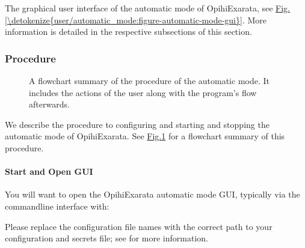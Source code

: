 \documentclass[letterpaper,11pt,english]{sphinxmanual}
\begin{document}
\sphinxAtStartPar
The graphical user interface of the automatic mode of OpihiExarata, see
\hyperref[\detokenize{user/automatic_mode:figure-automatic-mode-gui}]{Fig.\@ \ref{\detokenize{user/automatic_mode:figure-automatic-mode-gui}}}. More information is detailed in the
respective subsections of this section.


\subsubsection{Procedure}
\label{\detokenize{user/automatic_mode:procedure}}
\begin{figure}[H]
\centering
\capstart

\noindent{}
\caption{A flowchart summary of the procedure of the automatic mode. It includes
the actions of the user along with the program’s flow afterwards.}\label{\detokenize{user/automatic_mode:id2}}\label{\detokenize{user/automatic_mode:figure-automatic-mode-flowchart}}\end{figure}

\sphinxAtStartPar
We describe the procedure to configuring and starting and stopping the
automatic mode of OpihiExarata. See \hyperref[\detokenize{user/automatic_mode:figure-automatic-mode-flowchart}]{Fig.\@ \ref{\detokenize{user/automatic_mode:figure-automatic-mode-flowchart}}}
for a flowchart summary of this procedure.


\paragraph{Start and Open GUI}
\label{\detokenize{user/automatic_mode:start-and-open-gui}}
\sphinxAtStartPar
You will want to open the OpihiExarata automatic mode GUI, typically via the
command\sphinxhyphen{}line interface with:

\begin{sphinxVerbatim}[commandchars=\\\{\}]
   
\end{sphinxVerbatim}

\sphinxAtStartPar
Please replace the configuration file names with the correct path to your
configuration and secrets file; see {\hyperref[\detokenize{user/configuration:user-configuration}]{}} for more
information.
\end{document}
